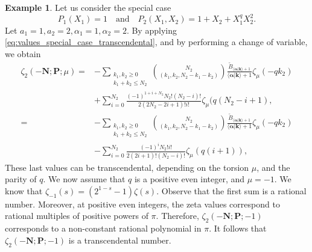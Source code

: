 \documentclass[a4paper,12pt]{article}
\theoremstyle{definition}
\newtheorem{example}[thm]{Example}
\numberwithin{equation}{section}
\begin{document}
\begin{example}\label{transcendental}
Let us consider the special case
$$P_1 (X_1)=1 \quad \text{and} \quad P_2(X_1, X_2)=1+ X_2+ X_1^q X_2^2. $$
Let $a_1=1, a_2=2, \alpha_1=1, \alpha_2=2$. By applying \eqref{eq:values_special_case_transcendental}, and by performing a change of variable, we obtain
\begin{align*}
    \zeta_{2}(-\mathbf{N};\mathbf{P};\mu)=&-\sum_{\substack{k_1,k_2 \geq 0 \\ k_1+k_2 \leq N_2}} \binom{N_2}{(k_1,k_2,N_2-k_1-k_2)} \frac{\widetilde{B}_{\langle \boldsymbol{\alpha}|\mathbf{k}\rangle+1}}{\langle \boldsymbol{\alpha}|\mathbf{k} \rangle+1} \zeta_{\mu}(-qk_2)\\
    &+ \sum_{i=0}^{N_2} \frac{(-1)^{1+i+N_2}N_2!(N_2-i)!}{2(2N_2-2i+1)!i!} \zeta_{\mu}(q(N_2-i+1), \\
    =&-\sum_{\substack{k_1,k_2 \geq 0 \\ k_1+k_2 \leq N_2}} \binom{N_2}{(k_1,k_2,N_2-k_1-k_2)} \frac{\widetilde{B}_{\langle \boldsymbol{\alpha}|\mathbf{k}\rangle+1}}{\langle \boldsymbol{\alpha}|\mathbf{k} \rangle+1} \zeta_{\mu}(-qk_2)\\
    &- \sum_{i=0}^{N_2} \frac{(-1)^{i}N_2!i!}{2(2i+1)!(N_2-i)!} \zeta_{\mu}(q(i+1)),
\end{align*}
These last values can be transcendental, depending on the torsion $\mu$, and the parity of $q$. We now assume that $q$ is a positive even integer, and $\mu=-1$. We know that $\zeta_{-1}(s)=(2^{1-s}-1)\zeta(s)$. Observe that the first sum is a rational number. Moreover, at positive even integers, the zeta values correspond to rational multiples of positive powers of $\pi$. Therefore, $\zeta_{2}(-\mathbf{N};\mathbf{P};-1)$ corresponds to a non-constant rational polynomial in $\pi$. It follows that $\zeta_{2}(-\mathbf{N};\mathbf{P};-1)$ is a transcendental number.
\end{example}

\end{document}
